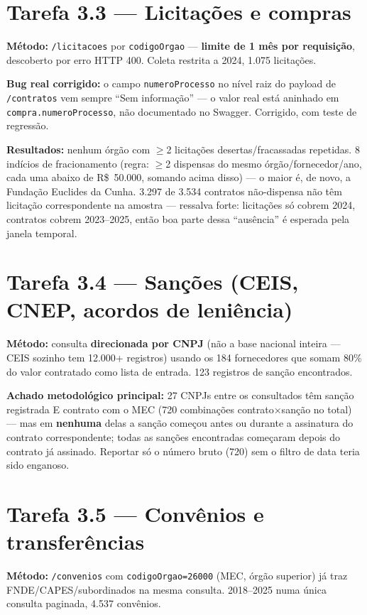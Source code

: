 \documentclass[11pt,a4paper]{article}
\begin{document}
\section{Tarefa 3.3 --- Licitações e compras}

\textbf{Método:} \texttt{/licitacoes} por \texttt{codigoOrgao} ---
\textbf{limite de 1 mês por requisição}, descoberto por erro HTTP 400.
Coleta restrita a 2024, 1.075 licitações.

\textbf{Bug real corrigido:} o campo \texttt{numeroProcesso} no nível
raiz do payload de \texttt{/contratos} vem sempre ``Sem informação'' --- o
valor real está aninhado em \texttt{compra.numeroProcesso}, não
documentado no Swagger. Corrigido, com teste de regressão.

\textbf{Resultados:} nenhum órgão com $\geq$2 licitações desertas/fracassadas
repetidas. 8 indícios de fracionamento (regra: $\geq$2 dispensas do mesmo
órgão/fornecedor/ano, cada uma abaixo de R\$~50.000, somando acima disso)
--- o maior é, de novo, a Fundação Euclides da Cunha. 3.297 de 3.534
contratos não-dispensa não têm licitação correspondente na amostra ---
ressalva forte: licitações só cobrem 2024, contratos cobrem 2023--2025,
então boa parte dessa ``ausência'' é esperada pela janela temporal.

\section{Tarefa 3.4 --- Sanções (CEIS, CNEP, acordos de leniência)}

\textbf{Método:} consulta \textbf{direcionada por CNPJ} (não a base
nacional inteira --- CEIS sozinho tem 12.000+ registros) usando os 184
fornecedores que somam 80\% do valor contratado como lista de entrada.
123 registros de sanção encontrados.

\textbf{Achado metodológico principal:} 27 CNPJs entre os consultados têm
sanção registrada E contrato com o MEC (720 combinações contrato×sanção
no total) --- mas em \textbf{nenhuma} delas a sanção começou antes ou
durante a assinatura do contrato correspondente; todas as sanções
encontradas começaram depois do contrato já assinado. Reportar só o
número bruto (720) sem o filtro de data teria sido enganoso.

\section{Tarefa 3.5 --- Convênios e transferências}

\textbf{Método:} \texttt{/convenios} com \texttt{codigoOrgao=26000} (MEC,
órgão superior) já traz FNDE/CAPES/subordinados na mesma consulta.
2018--2025 numa única consulta paginada, 4.537 convênios.
\end{document}
